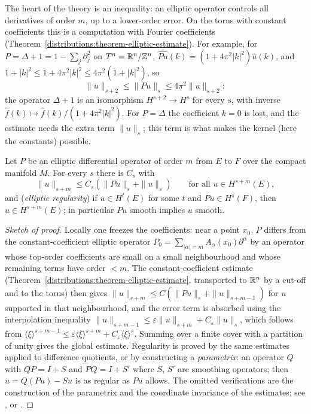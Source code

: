 The heart of the theory is an inequality: an elliptic operator controls all derivatives of order $m$, up to a lower-order error. On the torus with constant coefficients this is a computation with
Fourier coefficients (Theorem~\ref{distributions:theorem-elliptic-estimate}). For example, for $P = \Delta + 1 = 1 - \sum_j\partial_j^2$ on $T^n = \mathbb{R}^n/\mathbb{Z}^n$, $\widehat{Pu}(k) = (1 + 4\pi^2|k|^2)\hat u(k)$, and
$1 + |k|^2 \leq 1 + 4\pi^2|k|^2 \leq 4\pi^2(1 + |k|^2)$, so
\[
\|u\|_{s+2} \leq \|Pu\|_s \leq 4\pi^2\|u\|_{s+2}:
\]
the operator $\Delta + 1$ is an isomorphism $H^{s+2} \to H^s$ for every $s$, with inverse $\hat f(k) \mapsto \hat f(k)/(1 + 4\pi^2|k|^2)$. For $P = \Delta$ the coefficient $k = 0$ is lost, and the estimate needs the
extra term $\|u\|_s$; this term is what makes the kernel (here the constants) possible.

\begin{theorem}\label{elliptic-operators:theorem-elliptic-estimate}
Let $P$ be an elliptic differential operator of order $m$ from $E$ to $F$ over the compact manifold $M$. For every $s$ there is $C_s$ with
\[
\|u\|_{s+m} \leq C_s\left(\|Pu\|_s + \|u\|_s\right) \qquad \text{for all } u \in H^{s+m}(E),
\]
and (\emph{elliptic regularity}) if $u \in H^t(E)$ for some $t$ and $Pu \in H^s(F)$, then $u \in H^{s+m}(E)$; in particular $Pu$ smooth implies $u$ smooth.
\end{theorem}

\begin{proof}[Sketch of proof]
Locally one freezes the coefficients: near a point $x_0$, $P$ differs from the constant-coefficient elliptic operator $P_0 = \sum_{|\alpha| = m}A_\alpha(x_0)\partial^\alpha$ by an operator whose top-order
coefficients are small on a small neighbourhood and whose remaining terms have order $< m$. The constant-coefficient estimate
(Theorem~\ref{distributions:theorem-elliptic-estimate}, transported to $\mathbb{R}^n$ by a cut-off and to the torus) then gives
$\|u\|_{s+m} \leq C(\|Pu\|_s + \|u\|_{s+m-1})$ for $u$ supported in that neighbourhood, and the error term is absorbed using the interpolation inequality
$\|u\|_{s+m-1} \leq \varepsilon\|u\|_{s+m} + C_\varepsilon\|u\|_s$, which follows from
$\langle\xi\rangle^{s+m-1} \leq \varepsilon\langle\xi\rangle^{s+m} + C_\varepsilon\langle\xi\rangle^s$. Summing over a finite cover with a partition of unity gives the global estimate. Regularity is proved by the same
estimates applied to difference quotients, or by constructing a \emph{parametrix}: an operator $Q$ with $QP = I + S$ and $PQ = I + S'$ where $S$, $S'$ are smoothing operators; then $u = Q(Pu) - Su$ is as
regular as $Pu$ allows. The omitted verifications are the construction of the parametrix and the coordinate invariance of the estimates; see \cite[Chapter 6]{warner-foundations},
\cite[Chapter 4]{wells-differential-analysis} or \cite[Chapters 17--18]{hormander-pdo1}.
\end{proof}

